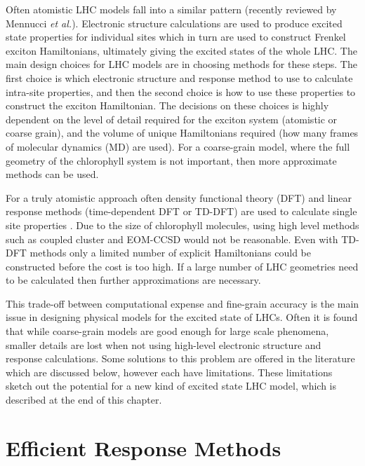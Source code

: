 Often atomistic LHC models fall into a similar pattern (recently reviewed by Mennucci 
\emph{et al.})\cite{Cignoni2022}. Electronic structure calculations are used to
produce excited state properties for individual sites which in turn are used to
construct Frenkel exciton Hamiltonians, ultimately giving the excited states of
the whole LHC. The main design choices for LHC models are in choosing methods for
these steps. The first choice is which electronic structure and response method 
to use to calculate intra-site properties, and then the second choice is how to 
use these properties to construct the exciton Hamiltonian. The decisions on these
choices is highly dependent on the level of detail required for the exciton system
(atomistic or coarse grain), and the volume of unique Hamiltonians required (how 
many frames of molecular dynamics (MD) are used). For a coarse-grain model, where
the full geometry of the chlorophyll system is not important, then more approximate 
methods can be used.

For a truly atomistic approach often density functional theory (DFT) and linear 
response methods (time-dependent DFT or TD-DFT) are used to calculate single site
properties \cite{Cignoni2022}. Due to the size of chlorophyll molecules, using high
level methods such as coupled cluster and EOM-CCSD would not be reasonable. Even 
with TD-DFT methods only a limited number of explicit Hamiltonians could be constructed
before the cost is too high. If a large number of LHC geometries need to be calculated 
then further approximations are necessary.

This trade-off between computational expense and fine-grain accuracy is the main
issue in designing physical models for the excited state of LHCs. Often it is found
that while coarse-grain models are good enough for large scale phenomena, smaller
details are lost when not using high-level electronic structure and response calculations.
Some solutions to this problem are offered in the literature which are discussed 
below, however each have limitations. These limitations sketch out the potential 
for a new kind of excited state LHC model, which is described at the end of this 
chapter.

\section{Efficient Response Methods}
\label{sec:efficient_response_methods}

